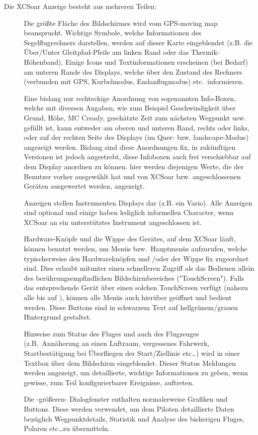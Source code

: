 Die  \textsf{XCSoar} Anzeige besteht aus mehreren Teilen:
\begin{description}
\item[] Die größte Fläche des Bildschirmes wird vom GPS-moving map beansprucht.
Wichtige Symbole, welche Informationen des Segelflugrechners darstellen, werden auf dieser Karte
eingeblendet (z.B. die Über/Unter Gleitpfad-Pfeile am linken Rand oder das Thermik-Höhenband).
Einige Icons und Textinformationen  erscheinen  (bei Bedarf) am unteren Rande des Displays,
welche über den Zustand des Rechners (verbunden mit GPS, Kurbelmodus, Endanflugmodus) etc.\  informieren.
%
\item[] Eine bislang nur rechteckige Anordnung von sogenannten Info-Boxen, welche mit diversen Angaben, wie zum Beispiel Geschwindigkeit über Grund,
Höhe, MC Cready, geschätzte Zeit zum nächsten Wegpunkt usw. gefüllt ist, kann entweder am oberen und unteren Rand, rechts oder links,
oder auf der rechten Seite des Displays (im Quer- bzw. landscape-Modus) angezeigt werden. Bislang sind diese Anordnungen fix, in zukünftigen Versionen ist jedoch angestrebt, diese Infoboxen auch frei verschiebbar auf dem Display anordnen zu können.
%
hier werden diejenigen Werte, die der Benutzer vorher ausgewählt  hat und von \textsf{XCSoar} bzw. angeschlossenen Geräten ausgewertet werden, angezeigt.
%
\item[] Anzeigen stellen Instrumenten Displays dar (z.B. ein Vario). Alle Anzeigen sind optional und einige
haben lediglich informellen  Character, wenn \textsf{XCSoar} an ein unterstütztes Instrument angeschlossen ist.
%
\item[] Hardware-Knöpfe und die Wippe des Gerätes, auf dem \textsf{XCSoar} läuft, können benutzt werden, um Menüs bzw.\ Hauptmenüs aufzurufen, welche typischerweise den Hardwareknöpfen und /oder der Wippe fix zugeordnet sind. Dies erlaubt mitunter einen schnelleren Zugriff als das Bedienen allein des berührungsempfindlichen Bildschirmbereiches ("TouchScreen").
Falls das entsprechende Gerät über einen solchen TouchScreen verfügt (nahezu alle bis auf \al), können alle Menüs auch
hierüber geöffnet und bedient werden. Diese Buttons sind in schwarzem Text auf hellgrünem/grauen Hintergrund gestaltet.
%
\item[] Hinweise zum Status des Fluges und auch des Flugzeuges  (z.B.\ Annäherung an einen Luftraum, vergessenes Fahrwerk, Startbestätigung bei Überfliegen der Start/Ziellinie etc\dots ) wird in einer Textbox  über dem Bildschirm eingeblendet.
Dieser Status Meldungen werden angezeigt, um detaillierte, wichtige Informationen zu geben, wenn gewisse, zum Teil konfigurierbarer Ereignisse, auftreten.
%
\item[] Die -größeren- Dialogfenster enthalten normalerweise Grafiken und Buttons. Diese werden verwendet, um dem Piloten  detaillierte Daten bezüglich Wegpunktdetails, Statistik und Analyse des bisherigen Fluges, Polaren etc\dots  zu übermitteln.


\end{description}
